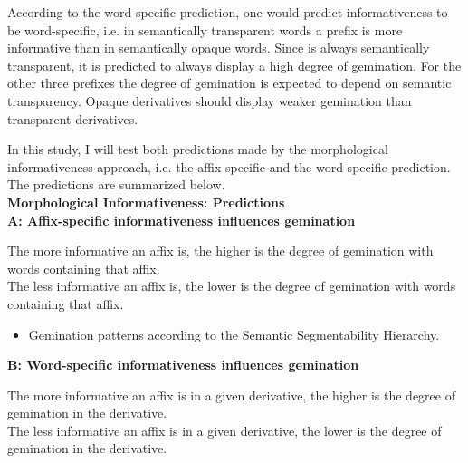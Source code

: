 {According to the word-specific prediction, one would predict informativeness to be word-specific, i.e. in semantically transparent words a prefix is more informative than in semantically opaque words. Since  is always semantically transparent, it is predicted to always display a high degree of gemination. For the other three prefixes the degree of gemination is expected to depend on semantic transparency. Opaque derivatives should display weaker gemination than transparent derivatives. 

In this study, I will test both predictions made by the morphological informativeness approach, i.e. the affix-specific and the word-specific prediction. The predictions are summarized below.\\


\noindent \textbf{Morphological Informativeness: Predictions}\\	

\noindent 	\textbf{A:\hspace{0.5cm} Affix-specific informativeness influences gemination}\vspace{0.2 cm}
	
\noindent		The more informative an affix is, the higher is the degree of gemination with words containing that affix. \\
		
\noindent	The less informative an affix is, the lower is the degree of gemination with words 
		containing that affix. 
	
				\begin{itemize}
	\item	Gemination patterns according to the Semantic Segmentability Hierarchy. 		\\
		

\end{itemize}


	
\noindent	\textbf{B: \hspace{0.5cm} Word-specific informativeness influences gemination}\vspace{0.2 cm}
	
\noindent	The more informative an affix is in a given derivative, the higher is the degree of gemination in the derivative.\\ 


	
\noindent	The less informative an affix is in a given derivative, the lower is the degree of gemination in the derivative.%
	
}
